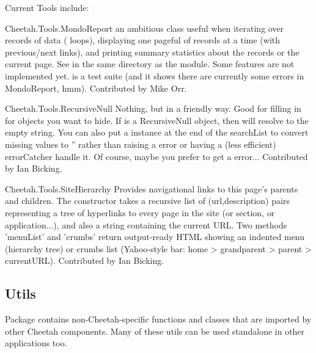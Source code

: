 Current Tools include:
\begin{description}
\item{Cheetah.Tools.MondoReport} an ambitious class useful when
     iterating over records of data ( loops), displaying one
     pageful of records at a time (with previous/next links), and printing
     summary statistics about the records or the current page.  See
      in the same directory as the module.  Some
     features are not implemented yet.   is a test
     suite (and it shows there are currently some errors in MondoReport, hmm).
     Contributed by Mike Orr.

\item{Cheetah.Tools.RecursiveNull} Nothing, but in a friendly way.  Good
     for filling in for objects you want to hide.  If  is a
     RecursiveNull object, then 
     will resolve to the empty string.  You can also put a 
     instance at the end of the searchList to convert missing values to ''
     rather than raising a  error or having a (less efficient)
     errorCatcher handle it.  Of course, maybe you prefer to get a
      error...  Contributed by Ian Bicking.

\item{Cheetah.Tools.SiteHierarchy} Provides navigational links to this
     page's parents and children.  The constructor takes a recursive list of
     (url,description) pairs representing a tree of hyperlinks to every page in
     the site (or section, or application...), and also a string containing the
     current URL.  Two methods 'menuList' and 'crumbs' return output-ready HTML
     showing an indented menu (hierarchy tree) or crumbs list (Yahoo-style bar:
     home > grandparent > parent > currentURL).  Contributed by Ian Bicking.

\item 
\end{description}


\subsection{Utils}
\label{libraries.Utils}

Package  contains non-Cheetah-specific functions and
classes that are imported by other Cheetah components.  Many of these utils can
be used standalone in other applications too.  

